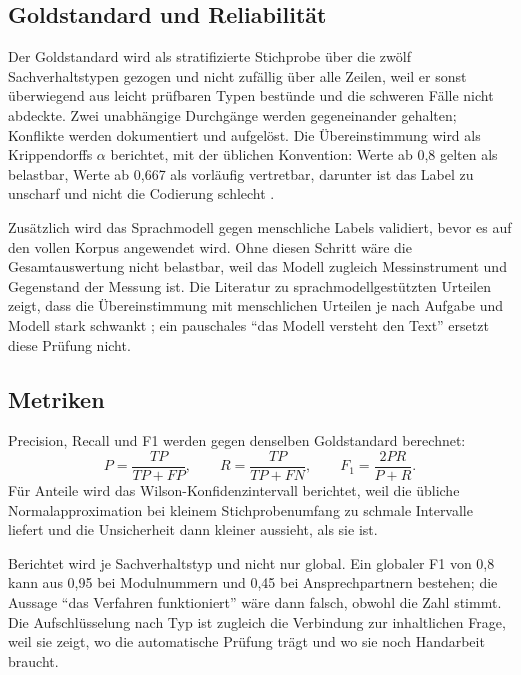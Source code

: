 \subsection{Goldstandard und Reliabilität}

Der Goldstandard wird als stratifizierte Stichprobe über die zwölf Sachverhaltstypen gezogen
und nicht zufällig über alle Zeilen, weil er sonst überwiegend aus leicht prüfbaren Typen
bestünde und die schweren Fälle nicht abdeckte. Zwei unabhängige Durchgänge werden
gegeneinander gehalten; Konflikte werden dokumentiert und aufgelöst. Die Übereinstimmung wird
als Krippendorffs $\alpha$ berichtet, mit der üblichen Konvention: Werte ab 0,8 gelten als
belastbar, Werte ab 0,667 als vorläufig vertretbar, darunter ist das Label zu unscharf und
nicht die Codierung schlecht \parencite{krippendorff2004}.

Zusätzlich wird das Sprachmodell gegen menschliche Labels validiert, bevor es auf den vollen
Korpus angewendet wird. Ohne diesen Schritt wäre die Gesamtauswertung nicht belastbar, weil
das Modell zugleich Messinstrument und Gegenstand der Messung ist. Die Literatur zu
sprachmodellgestützten Urteilen zeigt, dass die Übereinstimmung mit menschlichen Urteilen je
nach Aufgabe und Modell stark schwankt \parencite{bavaresco2025llms}; ein pauschales
\enquote{das Modell versteht den Text} ersetzt diese Prüfung nicht.

\subsection{Metriken}

Precision, Recall und F1 werden gegen denselben Goldstandard berechnet:
\begin{equation}
  P = \frac{TP}{TP+FP}, \qquad R = \frac{TP}{TP+FN}, \qquad F_1 = \frac{2PR}{P+R}.
\end{equation}
Für Anteile wird das Wilson-Konfidenzintervall berichtet, weil die übliche Normalapproximation
bei kleinem Stichprobenumfang zu schmale Intervalle liefert und die Unsicherheit dann
kleiner aussieht, als sie ist.

Berichtet wird je Sachverhaltstyp und nicht nur global. Ein globaler F1 von 0,8 kann aus 0,95
bei Modulnummern und 0,45 bei Ansprechpartnern bestehen; die Aussage \enquote{das Verfahren
funktioniert} wäre dann falsch, obwohl die Zahl stimmt. Die Aufschlüsselung nach Typ ist
zugleich die Verbindung zur inhaltlichen Frage, weil sie zeigt, wo die automatische Prüfung
trägt und wo sie noch Handarbeit braucht.
